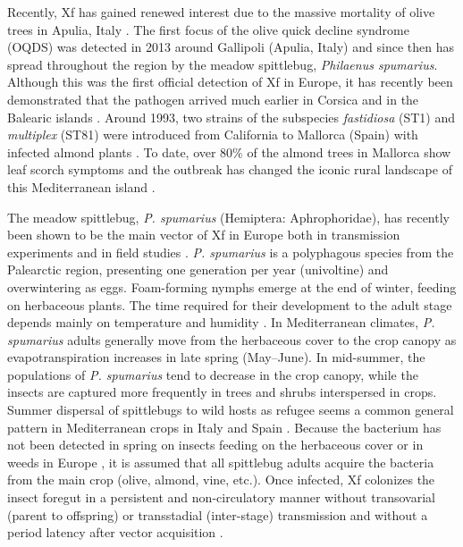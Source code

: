 Recently, Xf has gained renewed interest due to the massive mortality of
olive trees in Apulia, Italy \cite{Saponari2019}. The first focus of
the olive quick decline syndrome (OQDS) was detected in 2013 around Gallipoli
(Apulia, Italy)\cite{Saponari2013} and since then has spread
throughout the region by the meadow spittlebug, \textit{Philaenus spumarius}.
Although this was the first official detection of Xf in Europe, it has recently
been demonstrated that the pathogen arrived much earlier in Corsica
\cite{Soubeyrand2018} and in the Balearic islands \cite{Moralejo2020}.
Around 1993, two strains of the subspecies \textit{fastidiosa} (ST1) and
\textit{multiplex} (ST81) were introduced from California to Mallorca (Spain)
with infected almond plants \cite{Moralejo2020}. To date, over 80\% of the
almond trees in Mallorca show leaf scorch symptoms and the outbreak has changed
the iconic rural landscape of this Mediterranean island \cite{Olmo2021}.

The meadow spittlebug,	\textit{P. spumarius} (Hemiptera: Aphrophoridae),
has recently been shown to be the main vector of Xf in Europe both in
transmission experiments and in field studies
\cite{Cornara2017,Cornara2018,lopez2022mechanical,Moralejo2019,Saponari2019}.
\textit{P. spumarius} is a polyphagous species from the Palearctic region,
presenting one generation per year (univoltine) and overwintering as eggs.
Foam-forming nymphs emerge at the end of winter, feeding on herbaceous plants.
The time required for their development to the adult stage depends mainly on
temperature and humidity
\cite{bodino2019phenology,Chmiel1979,cornara2018philaenus}. In Mediterranean
climates,  \textit{P. spumarius} adults generally move from the herbaceous
cover to the crop canopy as evapotranspiration increases in late spring
(May–June). In mid-summer, the populations of \textit{P. spumarius} tend to
decrease in the crop canopy, while the insects are captured more frequently in
trees and shrubs interspersed in crops. Summer dispersal of spittlebugs to wild
hosts as refugee seems a common general pattern in Mediterranean crops in Italy
\cite{bodino2019phenology,cornara2021natural} and Spain
\cite{morente2018distribution}. Because the bacterium has not been detected
in spring on insects feeding on the herbaceous cover or in weeds in Europe
\cite{bodino2019phenology,cornara2018philaenus,Olmo2021}, it is assumed that
all spittlebug adults acquire the bacteria from the main crop (olive, almond,
vine, etc.). Once infected, Xf colonizes the insect foregut in a persistent and
non-circulatory manner without transovarial (parent to offspring) or
transstadial (inter-stage) transmission
\cite{Almeida2003,freitag1951host,purcell1979evidence} and without
a period latency after vector acquisition \cite{Almeida2015,freitag1951host}.


